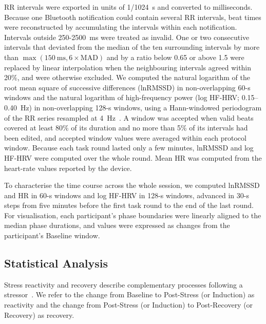  RR intervals were exported in units of 1/1024~s and converted to milliseconds. Because one Bluetooth notification could contain several RR intervals, beat times were reconstructed by accumulating the intervals within each notification. Intervals outside 250-2500~ms were treated as invalid. One or two consecutive intervals that deviated from the median of the ten surrounding intervals by more than $\max(150~\mathrm{ms}, 6\times\mathrm{MAD})$ and by a ratio below 0.65 or above 1.5 were replaced by linear interpolation when the neighbouring intervals agreed within 20\%, and were otherwise excluded. 
 We computed the natural logarithm of the root mean square of successive differences (lnRMSSD) in non-overlapping 60-s windows and the natural logarithm of high-frequency power (log HF-HRV; 0.15--0.40~Hz) in non-overlapping 128-s windows, using a Hann-windowed periodogram of the RR series resampled at 4~Hz~\citep{shaffer2017overview}. A window was accepted when valid beats covered at least 80\% of its duration and no more than 5\% of its intervals had been edited, and accepted window values were averaged within each protocol window. Because each task round lasted only a few minutes, lnRMSSD and log HF-HRV were computed over the whole round. Mean HR was computed from the heart-rate values reported by the device.

To characterise the time course across the whole session, we computed lnRMSSD and HR in 60-s windows and log HF-HRV in 128-s windows, advanced in 30-s steps from five minutes before the first task round to the end of the last round. For visualisation, each participant's phase boundaries were linearly aligned to the median phase durations, and values were expressed as changes from the participant's Baseline window.

\subsection{Statistical Analysis}

Stress reactivity and recovery describe complementary processes following a stressor~\citep{linden1997physiological,chida2008chronic}. We refer to the change from Baseline to Post-Stress (or Induction) as reactivity and the change from Post-Stress (or Induction) to Post-Recovery (or Recovery) as recovery.


